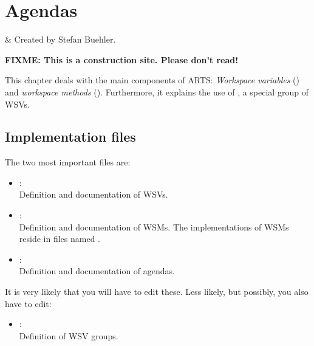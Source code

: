 
\chapter{Agendas}
\label{sec:agendas}

 & Created by Stefan Buehler.\\
\stophistory

{\Large \bf FIXME: This is a construction site. Please don't read!}

This chapter deals with the main components of ARTS: \emph{Workspace
  variables} () and
\emph{workspace methods} ().
Furthermore, it explains the use of , a special
group of WSVs.



\section{Implementation files}
\label{sec:agendas:files}

The two most important files are:
\begin{itemize}
\item {}:\\
  Definition and documentation of WSVs.
\item{}:\\
  Definition and documentation of WSMs. The
  implementations of WSMs reside in files named
  .
\item {}:\\
  Definition and documentation of agendas.
\end{itemize}
It is very likely that you will have to edit these. Less likely, but
possibly, you also have to edit:
\begin{itemize}
\item {}:\\
  Definition of WSV groups.
\end{itemize}

